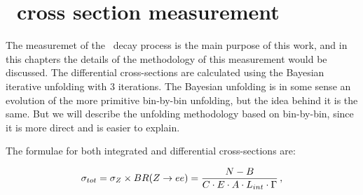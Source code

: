 \chapter{\Zee\ cross section measurement}
\label{sec:ZeeCrossSec}

The measuremet of the \Zee\ decay process is the main purpose of this work, and in this chapters the details of the methodology of this measurement would be discussed. The differential cross-sections are calculated using the Bayesian iterative unfolding with 3 iterations. The Bayesian unfolding is in some sense an evolution of the more primitive bin-by-bin unfolding, but the idea behind it is the same. But we will describe the unfolding methodology based on bin-by-bin, since it is more direct and is easier to explain.

The formulae for both integrated and differential cross-sections are:

\begin{equation}
\sigma_{tot} = \sigma_{Z} \times BR(Z \rightarrow ee) = \frac{N - B}{C \cdot E \cdot A \cdot L_{int}  \cdot \Gamma}\,,
\end{equation}

